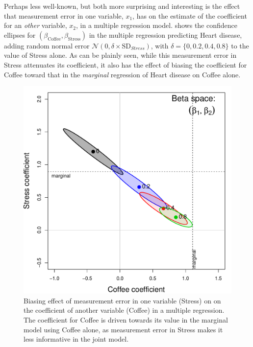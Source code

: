Perhaps less well-known, but both more surprising and interesting is the effect that measurement error in one variable,
$x_1$, 
has on the estimate of the coefficient for an \emph{other} variable, $x_2$, in a multiple regression model.
shows the confidence ellipses for $(\beta_{\textrm{Coffee}}, \beta_{\textrm{Stress}})$ in the multiple regression 
predicting Heart disease, adding random normal error
$\mathcal{N}(0, \delta \times \mathrm{SD}_{Stress})$, with $\delta = \{0, 0.2, 0.4, 0.8\}$ to the value of Stress
alone.  
As can be plainly seen, while this measurement error in Stress attenuates its coefficient,
it also has the effect of biasing the coefficient for Coffee toward that in the \emph{marginal}
regression of Heart disease on Coffee alone.


\begin{figure}[htb]
  \centering
  \includegraphics[width=.5\textwidth,clip]{fig/coffee-measerr}
  \caption{Biasing effect of measurement error in one variable (Stress) on on the coefficient of another variable
  (Coffee) in a multiple regression.  The coefficient for Coffee is driven towards its value in the marginal
  model using Coffee alone, as measurement error in Stress makes it less informative in the joint model.
  }%
  \label{fig:coffee-measerr}
\end{figure}



